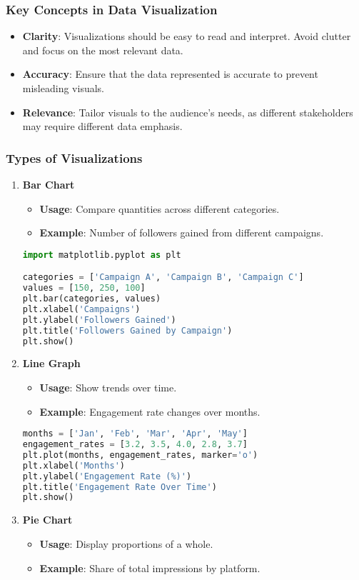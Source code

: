 \documentclass{beamer}
\begin{document}
\begin{frame}[fragile]
    \frametitle{Key Concepts in Data Visualization}
    \begin{itemize}
        \item \textbf{Clarity}: Visualizations should be easy to read and interpret. Avoid clutter and focus on the most relevant data.
        \item \textbf{Accuracy}: Ensure that the data represented is accurate to prevent misleading visuals.
        \item \textbf{Relevance}: Tailor visuals to the audience’s needs, as different stakeholders may require different data emphasis.
    \end{itemize}
\end{frame}

\begin{frame}[fragile]
    \frametitle{Types of Visualizations}
    \begin{enumerate}
        \item \textbf{Bar Chart}
        \begin{itemize}
            \item \textbf{Usage}: Compare quantities across different categories.
            \item \textbf{Example}: Number of followers gained from different campaigns.
        \end{itemize}
        \begin{lstlisting}[language=Python]
import matplotlib.pyplot as plt

categories = ['Campaign A', 'Campaign B', 'Campaign C']
values = [150, 250, 100]
plt.bar(categories, values)
plt.xlabel('Campaigns')
plt.ylabel('Followers Gained')
plt.title('Followers Gained by Campaign')
plt.show()
        \end{lstlisting}

        \item \textbf{Line Graph}
        \begin{itemize}
            \item \textbf{Usage}: Show trends over time.
            \item \textbf{Example}: Engagement rate changes over months.
        \end{itemize}
        \begin{lstlisting}[language=Python]
months = ['Jan', 'Feb', 'Mar', 'Apr', 'May']
engagement_rates = [3.2, 3.5, 4.0, 2.8, 3.7]
plt.plot(months, engagement_rates, marker='o')
plt.xlabel('Months')
plt.ylabel('Engagement Rate (%)')
plt.title('Engagement Rate Over Time')
plt.show()
        \end{lstlisting}

        \item \textbf{Pie Chart}
        \begin{itemize}
            \item \textbf{Usage}: Display proportions of a whole.
            \item \textbf{Example}: Share of total impressions by platform.
        \end{itemize}
    \end{enumerate}
\end{frame}
\end{document}
